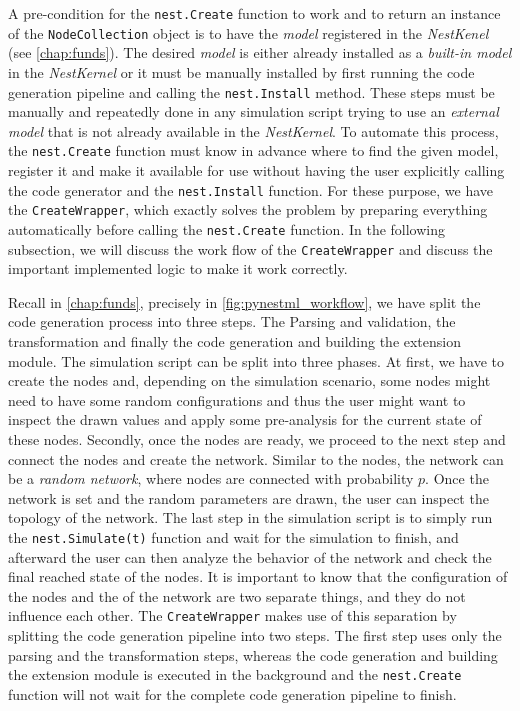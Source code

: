 A pre-condition for the \texttt{nest.Create} function to work and to return an instance of the \texttt{NodeCollection} object is to have the \emph{model} registered in the \emph{NestKenel} (see \autoref{chap:funds}). The desired \emph{model} is either already installed as a \emph{built-in model} in the \emph{NestKernel} or it must be manually installed by first running the code generation pipeline and calling the \texttt{nest.Install} method. These steps must be manually and repeatedly done in any simulation script trying to use an \emph{external model} that is not already available in the \emph{NestKernel}. To automate this process, the \texttt{nest.Create} function must know in advance where to find the given model, register it and make it available for use without having the user explicitly calling the code generator and the \texttt{nest.Install} function. For these purpose, we have the \texttt{CreateWrapper}, which exactly solves the problem by preparing everything automatically before calling the \texttt{nest.Create} function. In the following subsection, we will discuss the work flow of the \texttt{CreateWrapper} and discuss the important implemented logic to make it work correctly.


Recall in \autoref{chap:funds}, precisely in \autoref{fig:pynestml_workflow}, we have split the code generation process into three steps. The Parsing and validation, the transformation and finally the code generation and building the extension module. The simulation script can be split into three phases. At first, we have to create the nodes and, depending on the simulation scenario, some nodes might need to have some random configurations and thus the user might want to inspect the drawn values and apply some pre-analysis for the current state of these nodes. Secondly, once the nodes are ready, we proceed to the next step and connect the nodes and create the network. Similar to the nodes, the network can be a \emph{random network}, where nodes are connected with probability $p$. Once the network is set and the random parameters are drawn, the user can inspect the topology of the network. The last step in the simulation script is to simply run the \texttt{nest.Simulate(t)} function and wait for the simulation to finish, and afterward the user can then analyze the behavior of the network and check the final reached state of the nodes. It is important to know that the configuration of the nodes and the of the network are two separate things, and they do not influence each other. The \texttt{CreateWrapper} makes use of this separation by splitting the code generation pipeline into two steps. The first step uses only the parsing and the transformation steps, whereas the code generation and building the extension module is executed in the background and the \texttt{nest.Create} function will not wait for the complete code generation pipeline to finish.

